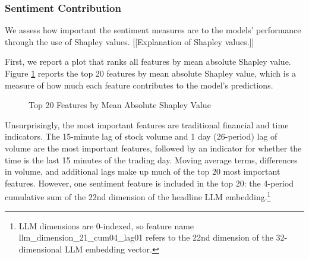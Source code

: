 \documentclass[12pt]{article}
\begin{document}
\subsubsection{Sentiment Contribution}
We assess how important the sentiment measures are to the models' performance through the use of Shapley values. [[Explanation of Shapley values.]]

First, we report a plot that ranks all features by mean absolute Shapley value. Figure \ref{fig:shapley_overall} reports the top 20 features by mean absolute Shapley value, which is a measure of how much each feature contributes to the model's predictions.
\begin{figure}[H]
    \centering
    \caption{Top 20 Features by Mean Absolute Shapley Value}
    \label{fig:shapley_overall}
\end{figure}

Unsurprisingly, the most important features are traditional financial and time indicators. The 15-minute lag of stock volume and 1 day (26-period) lag of volume are the most important features, followed by an indicator for whether the time is the last 15 minutes of the trading day. Moving average terms, differences in volume, and additional lags make up much of the top 20 most important features. However, one sentiment feature is included in the top 20: the 4-period cumulative sum of the 22nd dimension of the headline LLM embedding.\footnote{LLM dimensions are 0-indexed, so feature name llm\_dimension\_21\_cum04\_lag01 refers to the 22nd dimension of the 32-dimensional LLM embedding vector.}
\end{document}
